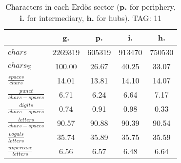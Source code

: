 \begin{table}[h!]
\begin{center}
\begin{tabular}{| l | c | c | c | c |}\hline
 & g. & p. & i. & h. \\\hline
$chars$ & 2269319  & 605319  & 913470  & 750530 \\\hline
$chars_{\%}$ & 100.00  & 26.67  & 40.25  & 33.07 \\\hline
$\frac{spaces}{chars}$ & 14.01  & 13.81  & 14.10  & 14.07 \\\hline
$\frac{punct}{chars-spaces}$ & 6.71  & 6.24  & 6.64  & 7.17 \\\hline
$\frac{digits}{chars-spaces}$ & 0.74  & 0.91  & 0.98  & 0.33 \\\hline
$\frac{letters}{chars-spaces}$ & 90.57  & 90.88  & 90.39  & 90.54 \\\hline
$\frac{vogals}{letters}$ & 35.74  & 35.89  & 35.75  & 35.59 \\\hline
$\frac{uppercase}{letters}$ & 6.56  & 6.57  & 6.48  & 6.64 \\\hline
\end{tabular}
\caption{Characters in each Erd\"os sector ({{\bf p.}} for periphery, {{\bf i.}} for intermediary, 
    {{\bf h.}} for hubs). TAG: 11}
\end{center}
\end{table}